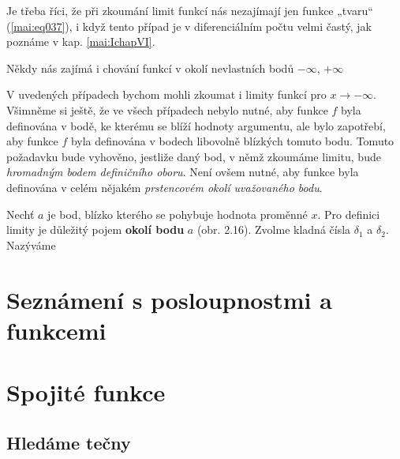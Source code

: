       

    Je třeba říci, že při zkoumání limit funkcí nás nezajímají jen funkce „tvaru“ 
    (\ref{mai:eq037}), i když tento případ je v diferenciálním počtu velmi častý, jak poznáme v 
    kap. \ref{mai:IchapVI}. 
    
    Někdy nás zajímá i chování funkcí v okolí nevlastních bodů \(-\infty\), \(+\infty\) 

      
    
      
    
    V uvedených případech bychom mohli zkoumat i limity funkcí pro \(x \to - \infty\).  Všimněme si 
    ještě, že ve všech případech nebylo nutné, aby funkce \(f\) byla definována v bodě, ke kterému 
    se blíží hodnoty argumentu, ale bylo zapotřebí, aby funkce \(f\) byla definována v bodech 
    libovolně blízkých tomuto bodu. Tomuto požadavku bude vyhověno, jestliže daný bod, v němž 
    zkoumáme limitu, bude \emph{hromadným bodem definičního oboru}. Není ovšem nutné, aby funkce 
    byla definována v celém nějakém \emph{prstencovém okolí uvažovaného bodu}.
    
    Nechť \(a\) je bod, blízko kterého se pohybuje hodnota proměnné \(x\). Pro definici limity je 
    důležitý pojem \textbf{okolí bodu} \(a\) (obr. 2.16). Zvolme kladná čísla \(\delta_1\) a 
    \(\delta_2\). Nazýváme
    
    
  \section{Seznámení s posloupnostmi a funkcemi}\label{mai:IchapIIIsecV}  
  \section{Spojité funkce}\label{mai:IchapIIIsecVI}
    \subsection{Hledáme tečny}\label{mai:IchapIIIsecVIIssecI}

